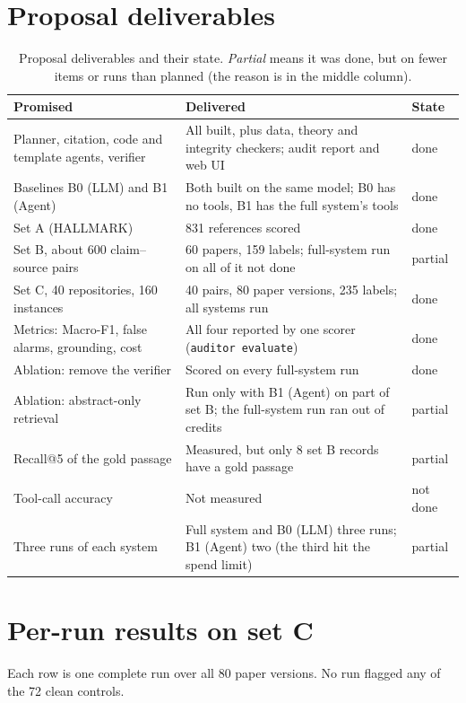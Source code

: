 \documentclass[11pt,a4paper]{article}
\begin{document}
\section{Proposal deliverables}\label{sec:deliverables}
\begin{table}[H]
\centering\small
\caption{Proposal deliverables and their state. \emph{Partial} means it was done, but on fewer
items or runs than planned (the reason is in the middle column).}
\label{tab:deliv}
\begin{tabularx}{\textwidth}{@{}lXl@{}}
\toprule
Promised & Delivered & State \\
\midrule
Planner, citation, code and template agents, verifier & All built, plus data, theory and integrity checkers; audit report and web UI & done \\
Baselines B0 (LLM) and B1 (Agent) & Both built on the same model; B0 has no tools, B1 has the full system's tools & done \\
Set A (HALLMARK) & 831 references scored & done \\
Set B, about 600 claim--source pairs & 60 papers, 159 labels; full-system run on all of it not done & partial \\
Set C, 40 repositories, 160 instances & 40 pairs, 80 paper versions, 235 labels; all systems run & done \\
Metrics: Macro-F1, false alarms, grounding, cost & All four reported by one scorer (\texttt{auditor evaluate}) & done \\
Ablation: remove the verifier & Scored on every full-system run & done \\
Ablation: abstract-only retrieval & Run only with B1 (Agent) on part of set B; the full-system run ran out of credits & partial \\
Recall@5 of the gold passage & Measured, but only 8 set B records have a gold passage & partial \\
Tool-call accuracy & Not measured & not done \\
Three runs of each system & Full system and B0 (LLM) three runs; B1 (Agent) two (the third hit the spend limit) & partial \\
\bottomrule
\end{tabularx}
\end{table}

\section{Per-run results on set C}
Each row is one complete run over all 80 paper versions. No run flagged any of the 72 clean
controls.
\end{document}

